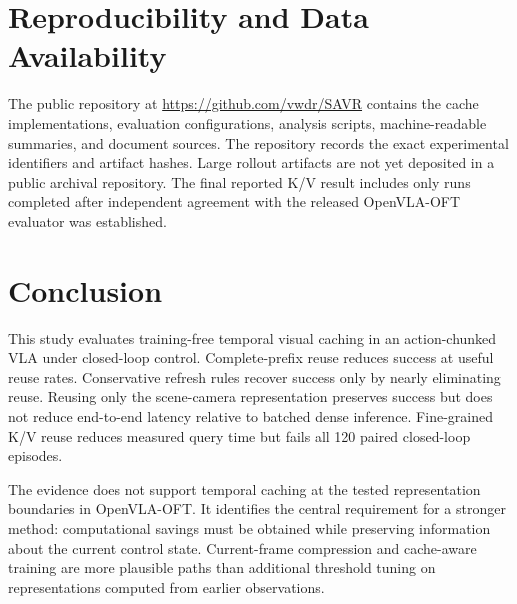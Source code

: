 \documentclass[journal]{IEEEtran}
\begin{document}
\section{Reproducibility and Data Availability}
The public repository at \url{https://github.com/vwdr/SAVR} contains the cache implementations, evaluation configurations, analysis scripts, machine-readable summaries, and document sources. The repository records the exact experimental identifiers and artifact hashes. Large rollout artifacts are not yet deposited in a public archival repository. The final reported K/V result includes only runs completed after independent agreement with the released OpenVLA-OFT evaluator was established.

\section{Conclusion}
This study evaluates training-free temporal visual caching in an action-chunked VLA under closed-loop control. Complete-prefix reuse reduces success at useful reuse rates. Conservative refresh rules recover success only by nearly eliminating reuse. Reusing only the scene-camera representation preserves success but does not reduce end-to-end latency relative to batched dense inference. Fine-grained K/V reuse reduces measured query time but fails all 120 paired closed-loop episodes.

The evidence does not support temporal caching at the tested representation boundaries in OpenVLA-OFT. It identifies the central requirement for a stronger method: computational savings must be obtained while preserving information about the current control state. Current-frame compression and cache-aware training are more plausible paths than additional threshold tuning on representations computed from earlier observations.



\end{document}
